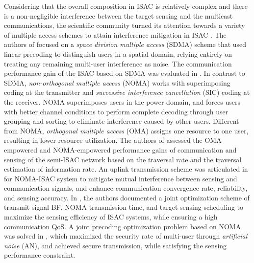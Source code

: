  Considering that the overall composition in ISAC is relatively complex and there is a non-negligible interference between the target sensing and the multicast communications, the scientific community turned its attention towards a variety of multiple access schemes to attain interference mitigation in ISAC \cite{MA_ISAC,Inter_ISAC}. The authors of \cite{ISAC_PLS_42} focused on a \emph{space division multiple access} (SDMA) scheme that used linear precoding to distinguish users in a spatial domain, relying entirely on treating any remaining multi-user interference as noise. The communication performance gain of the ISAC based on SDMA was evaluated in \cite{ISAC_PLS_43}. In contrast to SDMA, \emph{non-orthogonal multiple access} (NOMA) works with superimposing coding at the transmitter and \emph{successive interference cancellation} (SIC) coding at the receiver. NOMA superimposes users in the power domain, and forces users with better channel conditions to perform complete decoding through user grouping and sorting \cite{ISAC_PLS_42} to eliminate interference caused by other users. Different from NOMA, \emph{orthogonal multiple access} (OMA) assigns one resource to one user, resulting in lower resource utilization. 
The authors of \cite{ISAC_PLS_44} assessed the OMA-empowered and NOMA-empowered performance gains of communication and sensing of the semi-ISAC network based on the traversal rate and the traversal estimation of information rate. An uplink transmission scheme was articulated in \cite{ISAC_PLS_45} for NOMA-ISAC system to mitigate mutual interference between sensing and communication signals, and enhance communication convergence rate, reliability, and sensing accuracy. In \cite{ISAC_PLS_46_r}, the authors documented a joint optimization scheme of transmit signal BF, NOMA transmission time, and target sensing scheduling to maximize the sensing efficiency of ISAC systems, while ensuring a high communication QoS. 
A joint precoding optimization problem based on NOMA was solved in \cite{ISAC_PLS_47}, which maximized the security rate of multi-user through \emph{artificial noise} (AN), and achieved secure transmission, while satisfying the sensing performance constraint. 

